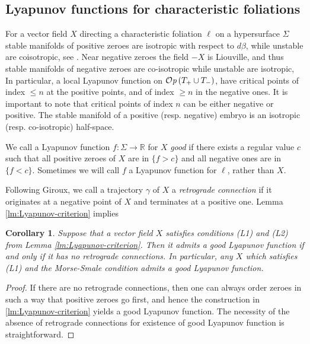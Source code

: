 \documentclass[12pt]{amsart}
\theoremstyle{plain}
\newtheorem{corollary}[theorem]{Corollary}
\theoremstyle{definition}
\theoremstyle{remark}
\newcommand{\R}{\mathbb{R}}
\newcommand{\Op}{ {\mathcal O}{\it p}\,}
\begin{document}
   
\subsection{Lyapunov functions for characteristic foliations}

 

For a  vector field $X$ directing a characteristic foliation   $\ell$ on a hypersurface $\Sigma$ stable manifolds of  positive zeroes   are isotropic with respect to $d\beta$,  while unstable are coisotropic, see \cite{CE12}.
Near  negative zeroes the field $-X$ is Liouville, and thus stable manifolds of negative zeroes    are  co-isotropic  while unstable are isotropic,    In particular,  a  local Lyapunov function on $\Op (T_+\cup T_-)$, have critical points of index $\leq n$ at  the positive points, and of  index $\geq n$ in the negative ones. It is important to note  that  critical points   of index $n$ can be either negative or positive.
The stable manifold of a positive (resp. negative)  embryo   is an isotropic
(resp. co-isotropic) half-space.


 
We call a Lyapunov function $f:\Sigma\to\R$ for $X$ {\em good}
if there exists a regular value $c$ such that all  positive zeroes of $X$ are in $\{f>c\}$ and all negative ones are in $\{f<c\}$.   Sometimes we will call $f$  a Lyapunov function for  $\ell$, rather than  $X$.

 

 
 Following Giroux, we call a trajectory $\gamma$ of $X$ a {\em retrograde connection} if it originates at a negative point of $X$ and terminates at a positive one.
 Lemma \ref{lm:Lyapunov-criterion} implies  
 \begin{corollary}\label{cor:good-Lyapunov}
 Suppose that a vector field $X$ satisfies conditions (L1) and (L2) from   Lemma \ref{lm:Lyapunov-criterion}.  Then it admits a good Lyapunov function if and only if it  has no retrograde connections. In particular, any  $X$ which satisfies (L1) and the   Morse-Smale condition admits a good Lyapunov function. \end{corollary}
\begin{proof} If there are no retrograde connections, then one can always order zeroes in such a way that positive zeroes go first, and hence the construction in \ref{lm:Lyapunov-criterion} yields a good Lyapunov function. The necessity of the absence of retrograde connections for existence of good Lyapunov function is straightforward.
\end{proof}
\end{document}
